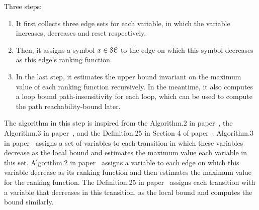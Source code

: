 Three steps:
\begin{enumerate}
    \item It first collects three edge sets for each variable,
  in which the variable increases, decreases and reset respectively.
  \item
  Then, it assigns a symbol $x \in \mathcal{SC}$ to the edge on which this symbol decreases as this edge's ranking function.
  \item
  In the last step, it estimates the upper bound invariant on the maximum value of each ranking function recursively.
  In the meantime, it also computes a loop bound path-insensitivity for each loop, which can be used to compute the path reachability-bound later.
  \end{enumerate}

  The algorithm in this step is inspired from the Algorithm.2 in paper~\cite{SinnZV14},
  the Algorithm.3 in paper~\cite{ZulegerGSV11},
  and the Definition.25 in Section 4 of paper~\cite{SinnZV17}.
  Algorithm.3 in paper~\cite{ZulegerGSV11} assigns a set of variables to each transition in which these variables decrease as the local bound
  and estimates the maximum value each variable in this set.
  Algorithm.2 in paper~\cite{SinnZV14} assigns a variable to each edge on which this variable decrease as its ranking function
  and then estimates the maximum value for the ranking function.
  The Definition.25 in paper~\cite{SinnZV17}
  assigns each transition with a variable that decreases in this transition, as the local bound and computes the bound similarly.
